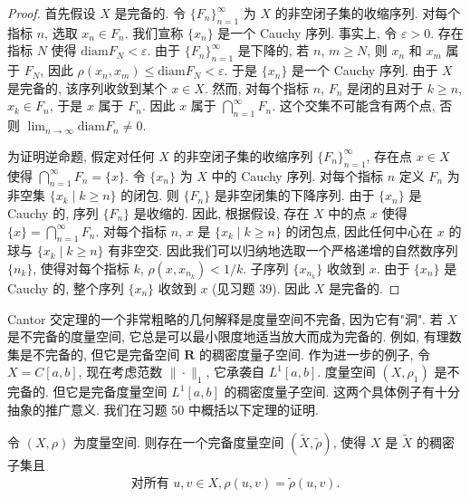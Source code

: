 \documentclass[../../main.tex]{subfiles}
\begin{document}
\begin{proof}
首先假设 $X$ 是完备的. 令 $\{F_{n}\}_{n=1}^{\infty}$ 为 $X$ 的非空闭子集的收缩序列. 对每个指标 $n$, 选取 $x_{n}\in F_{n}$. 我们宣称 $\{x_{n}\}$ 是一个 Cauchy 序列. 事实上, 令 $\varepsilon>0$. 存在指标 $N$ 使得 $\mathrm{diam}F_{N}<\varepsilon$. 由于 $\{F_{n}\}_{n=1}^{\infty}$ 是下降的, 若 $n$, $m\geqslant N$, 则 $x_{n}$ 和 $x_{m}$ 属于 $F_{N}$, 因此 $\rho(x_{n},x_{m})\leqslant\mathrm{diam}F_{N}<\varepsilon$. 于是 $\{x_{n}\}$ 是一个 Cauchy 序列. 由于 $X$ 是完备的, 该序列收敛到某个 $x\in X$. 然而, 对每个指标 $n$, $F_{n}$ 是闭的且对于 $k\geqslant n$, $x_{k}\in F_{n}$, 于是 $x$ 属于 $F_{n}$. 因此 $x$ 属于 $\bigcap_{n=1}^{\infty}F_{n}$. 这个交集不可能含有两个点, 否则 $\lim_{n\to\infty}\mathrm{diam}F_{n}\neq 0$.

为证明逆命题, 假定对任何 $X$ 的非空闭子集的收缩序列 $\{F_{n}\}_{n=1}^{\infty}$, 存在点 $x\in X$ 使得 $\bigcap_{n=1}^{\infty}F_{n}=\{x\}$. 令 $\{x_{n}\}$ 为 $X$ 中的 Cauchy 序列. 对每个指标 $n$ 定义 $F_{n}$ 为非空集 $\{x_{k}\mid k\geqslant n\}$ 的闭包. 则 $\{F_{n}\}$ 是非空闭集的下降序列. 由于 $\{x_{n}\}$ 是 Cauchy 的, 序列 $\{F_{n}\}$ 是收缩的. 因此, 根据假设, 存在 $X$ 中的点 $x$ 使得 $\{x\}=\bigcap_{n=1}^{\infty}F_{n}$. 对每个指标 $n$, $x$ 是 $\{x_{k}\mid k\geqslant n\}$ 的闭包点, 因此任何中心在 $x$ 的球与 $\{x_{k}\mid k\geqslant n\}$ 有非空交. 因此我们可以归纳地选取一个严格递增的自然数序列 $\{n_{k}\}$, 使得对每个指标 $k$, $\rho(x,x_{n_{k}})<1/k$. 子序列 $\{x_{n_{k}}\}$ 收敛到 $x$. 由于 $\{x_{n}\}$ 是 Cauchy 的, 整个序列 $\{x_{n}\}$ 收敛到 $x$ (见习题 39). 因此 $X$ 是完备的.
\end{proof}

Cantor 交定理的一个非常粗略的几何解释是度量空间不完备, 因为它有"洞". 若 $X$ 是不完备的度量空间, 它总是可以最小限度地适当放大而成为完备的. 例如, 有理数集是不完备的, 但它是完备空间 $\mathbf{R}$ 的稠密度量子空间. 作为进一步的例子, 令 $X=C[a,b]$, 现在考虑范数 $\|\cdot\|_{1}$, 它承袭自 $L^{1}[a,b]$. 度量空间 $(X,\rho_{1})$ 是不完备的. 但它是完备度量空间 $L^{1}[a,b]$ 的稠密度量子空间. 这两个具体例子有十分抽象的推广意义. 我们在习题 50 中概括以下定理的证明.

\begin{theorem}[完备化]\label{theorem:ch09-完备化}
令 $(X,\rho)$ 为度量空间. 则存在一个完备度量空间 $(\widetilde{X},\widetilde{\rho})$, 使得 $X$ 是 $\widetilde{X}$ 的稠密子集且
\begin{align*}
\text{对所有 }u,v\in X,\rho(u,v)=\widetilde{\rho}(u,v).
\end{align*}
\end{theorem}
\end{document}

